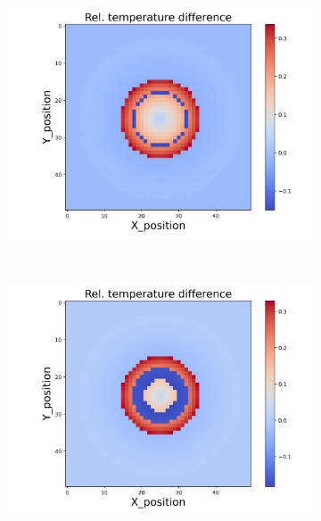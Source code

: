 \begin{figure}[h]
\begin{minipage}{\textwidth}
\begin{subfigure}{0.325\textwidth}
        \end{subfigure}
        \begin{subfigure}{0.325\textwidth}
            \centering
            \includegraphics[width=\textwidth]{figures/raw_data/21/quad/T_bias.jpg}
        \end{subfigure}
    \end{minipage}\\
    \begin{minipage}{\textwidth}
        \centering
        \begin{subfigure}{0.325\textwidth}
            \centering
            \includegraphics[width=\textwidth]{figures/raw_data/22/quad/T_bias.jpg}

\end{subfigure}
\end{minipage}
\end{figure}
